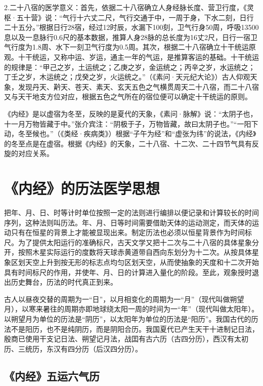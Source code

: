 \documentclass[draft,12pt]{ctexbook}
\begin{document}
2.二十八宿的医学意义：首先，依据二十八宿确立人身经脉长度、营卫行度，《灵枢·五十营》说：“气行十六丈二尺，气行交通于中，一周于身，下水二刻，日行二十五分。”根据日行28宿，经过12时辰，水漏下100刻，卫气行身50周，呼吸13500息以及一息脉行0.6尺的基本数据，推算人身28脉的总长度为16丈2尺，日行一宿卫气行度为1.8周、水下一刻卫气行度为0.5周。其次，根据二十八宿确立十干统运原观。十干统运，又称中运、岁运，通主一年的气运，是推算客运的基础。十干统运的规律是：“甲己之岁，土运统之；乙庚之岁，金运统之；丙辛之岁，水运统之；丁壬之岁，木运统之；戊癸之岁，火运统之。”（《素问·天元纪大论》）古人仰观天象，发现丹天、黅天、苍天、素天、玄天五色之气横贯周天二十八宿，而二十八宿又与天干地支方位对应，根据五色之气所在的宿位便可以确定十干统运的原则。

《内经》是以虚宿为冬至，反映的是夏代的天象，《素问·脉解》说：“太阴子也，十一月万物皆藏于中。”张介宾注：“阴极于子，万物皆藏，故曰太阴子也。”“一阳下动，冬至候也。”（《类经·疾病类》）根据“子午为经”和“虚张为纬”的说法，《内经》的冬至点是在虚宿。根据《内经》的天象，二十八宿、十二次、二十四节气具有反旋的对应关系。

\section{《内经》的历法医学思想}%

把年、月、日、时等计时单位按照一定的法则进行编排以便记录和计算较长的时间序列，这种法则叫历法。年、月、日等时间需要借助天体的运动测定，而天体的运动只有在恒星的背景上才能被显现出来。制定历法也必须以恒星背景作为时间标尺。为了提供太阳运行的准确标尺，古天文学又把十二次与二十八宿的具体星象分开，按照木星实际运行的度数将天球赤黄道带自西向东划分为十二次。从按具体星象区划天空上升到按无形的标志点均匀区划天空，从而使抽象的天度和十二次开始具有时间标尺的作用，并使年、月、日的计算进入量化的阶段。至此，观象授时退出历史舞台，历法的时代真正到来。

古人以昼夜交替的周期为一“日”，以月相变化的周期为一“月”（现代叫做朔望月），以寒来暑往的周期亦即地球绕太阳一周的时间为一“年”（现代叫做太阳年）。以朔望月为单位的历法是“阴历”，以太阳年为单位的历法是“阳历”。我国古代的历法不是阳历，也不是纯阴历，而是阴阳合历。我国夏代已产生天干十进制记日法，殷商已使用干支记日法、朔望记月法，战囯有古六历（古四分历），西汉有太初历、三统历，东汉有四分历（后汉四分历）。

\subsection{《内经》五运六气历}%
\end{document}
